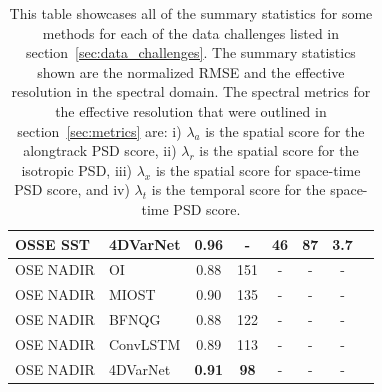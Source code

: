 \begin{table}[H]
{\begin{tabular}{llcccccc}
OSSE SST &  4DVarNet &  \textbf{0.96} & - & \textbf{46} & \textbf{87} & \textbf{3.7} \\
\midrule
OSE NADIR     &  OI & 0.88 & 151 & - &  - &  -\\
OSE NADIR     &  MIOST &  0.90 & 135 & - &  - &  -\\
OSE NADIR     &  BFNQG & 0.88 & 122 & - & - &  -\\
OSE NADIR &  ConvLSTM &  0.89 & 113 &- &  - &  -\\
OSE NADIR &  4DVarNet & \textbf{0.91} & \textbf{98} & - &  -  &  -\\
\bottomrule
\end{tabular}}
\caption{This table showcases all of the summary statistics for some methods for each of the data challenges listed in section~\ref{sec:data_challenges}. The summary statistics shown are the normalized RMSE and the effective resolution in the spectral domain. The spectral metrics for the effective resolution that were outlined in section~\ref{sec:metrics} are: i) $\lambda_a$ is the spatial score for the alongtrack PSD score, ii) $\lambda_r$ is the spatial score for the isotropic PSD, iii) $\lambda_x$ is the spatial score for space-time PSD score, and iv) $\lambda_t$ is the temporal score for the space-time PSD score.}
\end{table}











